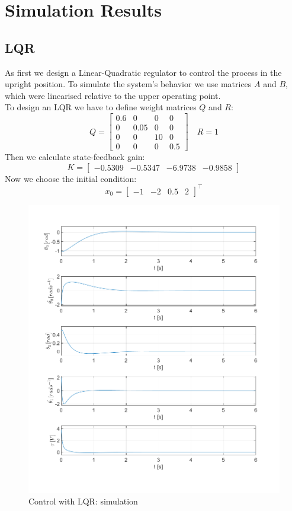 \chapter{Simulation Results}
\section{LQR}
As first we design a Linear-Quadratic regulator to control the process in the upright position. To simulate the system's behavior we use matrices $A$ and $B$, which were linearised relative to the upper operating point.\\
To design an LQR we have to define weight matrices $Q$ and $R$:
\begin{equation}
	Q = \begin{bmatrix}
	0.6&0&0&0\\
	0&0.05&0&0\\
	0&0&10&0\\
	0&0&0&0.5
	\end{bmatrix} \quad R = 1
\end{equation}
Then we calculate state-feedback gain:
\begin{equation}
	K = \begin{bmatrix}-0.5309&-0.5347&-6.9738&-0.9858\end{bmatrix}
\end{equation}
Now we choose the initial condition:
\begin{equation}
	x_0 = \begin{bmatrix}
	-1&-2&0.5&2
	\end{bmatrix}^\intercal
\end{equation}
\newpage
\begin{figure}[H]
	\centering
	\includegraphics[width=1.1\linewidth]{images/LQR}
	\caption{Control with LQR: simulation}
	\label{lqr}
\end{figure}
\newpage
